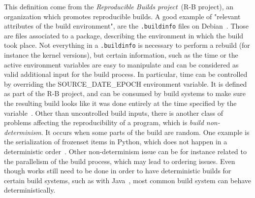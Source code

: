 \documentclass[a4paper,11pt,oneside]{report}
\theoremstyle{definition}
\newcommand{\rb}{reproducible builds\xspace}
\newcommand{\sde}{SOURCE\_DATE\_EPOCH\xspace}
\begin{document}
This definition come from the \emph{Reproducible Builds project}~(R-B project),
an organization which promotes \rb. A good example of "relevant attributes of
the build environment", are the \verb|.buildinfo| files on
Debian~\cite{debian:buildinfo}. Those are files associated to a package,
describing the environment in which the build took place. Not everything in a
\verb|.buildinfo| is necessary to perform a rebuild (for instance the kernel
versions), but certain information, such as the time or the active environment
variables are easy to manipulate and can be considered as valid additional
input for the build process. In particular, time can be controlled by
overriding the \sde environment variable. It is defined as part of the R-B
project, and can be consumed by build systems to make sure the resulting build
looks like it was done entirely at the time specified by the
variable~\cite{rb:sde}.
Other than uncontrolled build inputs, there is another class of problems
affecting the reproducibility of a program, which is \emph{build
non-determinism}. It occurs when some parts of the build are random. One
example is the serialization of frozenset items in Python, which does not
happen in a deterministic order~\cite{gh:pyc-frozenset}. Other non-determinism
issue can be for instance related to the parallelism of the build process,
which may lead to ordering issues. Even though works still need to be done in
order to have deterministic builds for certain build systems, such as with
Java~\cite{xiong2022towards}, most common build system can behave
deterministically.
\end{document}
